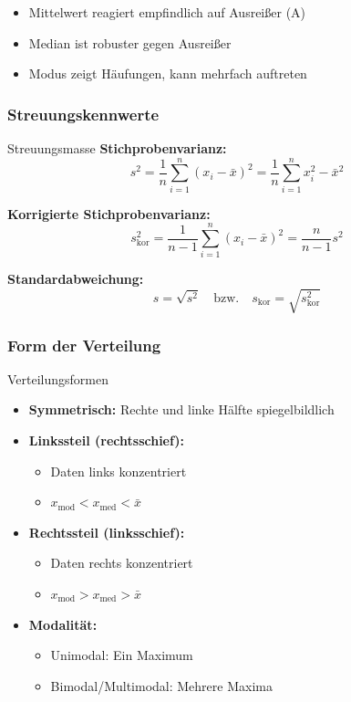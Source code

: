 \begin{remark}
\begin{itemize}
    \item Mittelwert reagiert empfindlich auf Ausreißer (A)
    \item Median ist robuster gegen Ausreißer
    \item Modus zeigt Häufungen, kann mehrfach auftreten
\end{itemize}
\end{remark}



\subsubsection{Streuungskennwerte}

\begin{definition}{Streuungsmasse}
\textbf{Stichprobenvarianz:}
$$s^2 = \frac{1}{n}\sum_{i=1}^n (x_i - \bar{x})^2 = \frac{1}{n}\sum_{i=1}^n x_i^2 - \bar{x}^2$$

\textbf{Korrigierte Stichprobenvarianz:}
$$s_{\text{kor}}^2 = \frac{1}{n-1}\sum_{i=1}^n (x_i - \bar{x})^2 = \frac{n}{n-1}s^2$$

\textbf{Standardabweichung:}
$$s = \sqrt{s^2} \quad \text{bzw.} \quad s_{\text{kor}} = \sqrt{s_{\text{kor}}^2}$$
\end{definition}

\subsubsection{Form der Verteilung}

\begin{concept}{Verteilungsformen}
\begin{itemize}
    \item \textbf{Symmetrisch:} Rechte und linke Hälfte spiegelbildlich
    \item \textbf{Linkssteil (rechtsschief):}
    \begin{itemize}
        \item Daten links konzentriert
        \item $x_{\text{mod}} < x_{\text{med}} < \bar{x}$
    \end{itemize}
    \item \textbf{Rechtssteil (linksschief):}
    \begin{itemize}
        \item Daten rechts konzentriert
        \item $x_{\text{mod}} > x_{\text{med}} > \bar{x}$
    \end{itemize}
    \item \textbf{Modalität:}
    \begin{itemize}
        \item Unimodal: Ein Maximum
        \item Bimodal/Multimodal: Mehrere Maxima
    \end{itemize}
\end{itemize}
\end{concept}